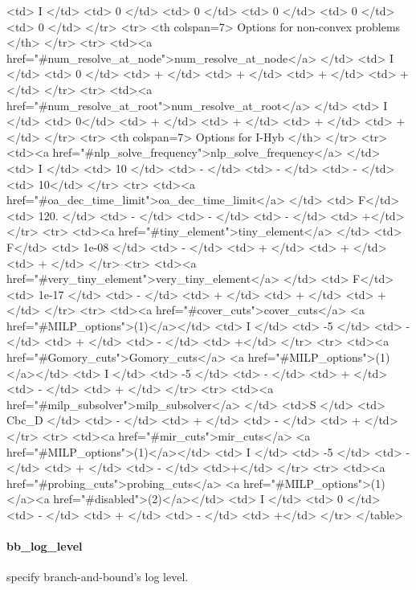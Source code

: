 {\begin{rawhtml}
    <td> I </td>
    <td> 0 </td>
    <td> 0 </td>
    <td> 0 </td>
    <td> 0 </td>
    <td> 0 </td>
  </tr>
  <tr>
     <th colspan=7> Options for non-convex problems </th>
  </tr>
  <tr>
    <td><a href="#num_resolve_at_node">num_resolve_at_node</a> </td>
    <td> I </td>
    <td> 0 </td>
    <td> + </td>
    <td> + </td>
    <td> + </td>
    <td> + </td>
  </tr>
  <tr>
    <td><a href="#num_resolve_at_root">num_resolve_at_root</a> </td>
    <td> I </td>
    <td> 0</td>
    <td> + </td>
    <td> + </td>
    <td> + </td>
    <td> + </td>
  </tr>
  <tr>
     <th colspan=7> Options for I-Hyb </th>
  </tr>
  <tr>
    <td><a href="#nlp_solve_frequency">nlp_solve_frequency</a> </td>
    <td> I </td>
    <td> 10 </td>
    <td> - </td>
    <td> - </td>
    <td> - </td>
    <td> 10</td>
  </tr>
  <tr>
    <td><a href="#oa_dec_time_limit">oa_dec_time_limit</a> </td>
    <td> F</td>
    <td> 120. </td>
    <td> - </td>
    <td> - </td>
    <td> - </td>
    <td> +</td>
  </tr>
  <tr>
    <td><a href="#tiny_element">tiny_element</a> </td>
    <td> F</td>
    <td> 1e-08 </td>
    <td> - </td>
    <td> + </td>
    <td> + </td>
    <td> + </td>
  </tr>
  <tr>
    <td><a href="#very_tiny_element">very_tiny_element</a> </td>
    <td> F</td>
    <td> 1e-17 </td>
    <td> - </td>
    <td> + </td>
    <td> + </td>
    <td> + </td>
  </tr>
    <tr>
    <td><a href="#cover_cuts">cover_cuts</a> <a href="#MILP_options">(1)</a></td>
    <td> I </td>
    <td> -5 </td>
    <td> - </td>
    <td> + </td>
    <td> - </td>
    <td> +</td>
  </tr>
  <tr>
    <td><a href="#Gomory_cuts">Gomory_cuts</a> <a href="#MILP_options">(1)</a></td>
    <td> I </td>
    <td> -5 </td>
    <td> - </td>
    <td> + </td>
    <td> - </td>
    <td> + </td>
  </tr>
  <tr>
    <td><a href="#milp_subsolver">milp_subsolver</a> </td>
    <td>S </td>
    <td> Cbc_D </td>
    <td> - </td>
    <td> + </td>
    <td> - </td>
    <td> + </td>
  </tr>
  <tr>
    <td><a href="#mir_cuts">mir_cuts</a> <a href="#MILP_options">(1)</a></td>
    <td> I </td>
    <td> -5 </td>
    <td> - </td>
    <td> + </td>
    <td> - </td>
    <td>+</td>
  </tr>
  <tr>
    <td><a href="#probing_cuts">probing_cuts</a> <a href="#MILP_options">(1)</a><a href="#disabled">(2)</a></td>
    <td> I </td>
    <td> 0 </td>
    <td> - </td>
    <td> + </td>
    <td> - </td>
    <td> +</td>
  </tr>
</table>
\end{rawhtml}
}
\label{app:opt_loglevel}
\paragraph{bb\_log\_level}
\label{bb_log_level} specify branch-and-bound's log level.

